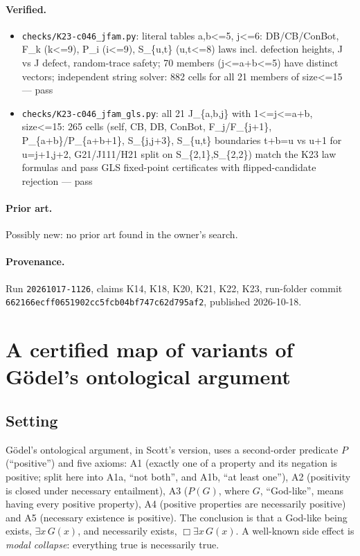 \documentclass{article}
\begin{document}
\paragraph{Verified.}
\begin{itemize}
\item \texttt{checks/K23-c046\_jfam.py}: literal tables a,b\textless{}=5, j\textless{}=6: DB/CB/ConBot, F\_k (k\textless{}=9), P\_i (i\textless{}=9), S\_\{u,t\} (u,t\textless{}=8) laws incl. defection heights, J vs J defect, random-trace safety; 70 members (j\textless{}=a+b\textless{}=5) have distinct vectors; independent string solver: 882 cells for all 21 members of size\textless{}=15 --- pass
\item \texttt{checks/K23-c046\_jfam\_gls.py}: all 21 J\_\{a,b,j\} with 1\textless{}=j\textless{}=a+b, size\textless{}=15: 265 cells (self, CB, DB, ConBot, F\_j/F\_\{j+1\}, P\_\{a+b\}/P\_\{a+b+1\}, S\_\{j,j+3\}, S\_\{u,t\} boundaries t+b=u vs u+1 for u=j+1,j+2, G21/J111/H21 split on S\_\{2,1\},S\_\{2,2\}) match the K23 law formulas and pass GLS fixed-point certificates with flipped-candidate rejection --- pass
\end{itemize}

\paragraph{Prior art.} Possibly new: no prior art found in the owner's search.

\paragraph{Provenance.}
Run \texttt{20261017-1126}, claims K14, K18, K20, K21, K22, K23, run-folder commit \texttt{662166ecff0651902cc5fcb04bf747c62d795af2}, published 2026-10-18.

\section{A certified map of variants of Gödel's ontological argument}
\label{sec:ontological-variant-map}

\subsection*{Setting}

Gödel's ontological argument, in Scott's version, uses a second-order predicate $P$ (``positive'')
and five axioms: A1 (exactly one of a property and its negation is positive; split here into
A1a, ``not both'', and A1b, ``at least one''), A2 (positivity is closed under necessary entailment),
A3 ($P(G)$, where $G$, ``God-like'', means having every positive property), A4 (positive
properties are necessarily positive) and A5 (necessary existence is positive). The conclusion is
that a God-like being exists, $\exists x\,G(x)$, and necessarily exists, $\Box\exists x\,G(x)$.
A well-known side effect is \emph{modal collapse}: everything true is necessarily true.
\end{document}
